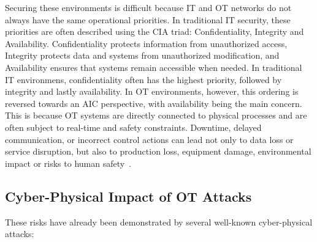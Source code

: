Securing these environments is difficult because IT and OT networks do not always have the same operational priorities.  In traditional IT security, these priorities are often described using the CIA triad: Confidentiality, Integrity and Availability. Confidentiality protects information from unauthorized access, Integrity protects data and systems from unauthorized modification, and Availability ensures that systems remain accessible when needed. In traditional IT environmens, confidentiality often has the highest priority, followed by integrity and lastly availability. In OT environments, however, this ordering is reversed towards an AIC perspective, with availability being the main concern. This is because OT systems are directly connected to physical processes and are often subject to real-time and safety constraints. Downtime, delayed communication, or incorrect control actions can lead not only to data loss or service disruption, but also to production loss, equipment damage, environmental impact or risks to human safety~\cite{abshari_survey_2025, kapoor_cyber_2025}.


\subsection{Cyber-Physical Impact of OT Attacks}
These risks have already been demonstrated by several well-known cyber-physical attacks:

